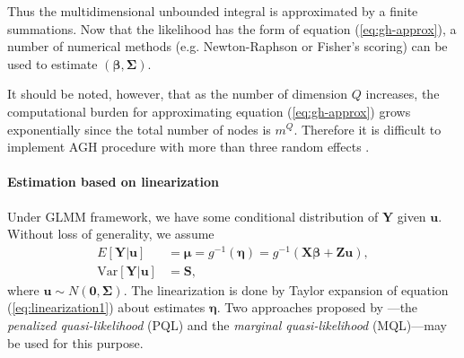 Thus the multidimensional unbounded integral is approximated by a finite summations. Now that the
likelihood has the form of equation (\ref{eq:gh-approx}), a number of numerical methods (e.g. 
Newton-Raphson
or Fisher's scoring) can be used to estimate $(\bm \beta,  \bm \Sigma)$. 

It should be noted, however, that as the number of dimension $Q$ increases, the computational 
burden for approximating equation (\ref{eq:gh-approx}) grows exponentially since the total number 
of nodes is $m^Q$. Therefore it is difficult to implement AGH procedure with more than three random 
effects \citep{bolker2009generalized}.


\paragraph{Estimation based on linearization}\label{para:linearization}



Under GLMM framework, we have some conditional distribution of $\bm Y$ given $\bm u$. Without loss
of generality, we assume
\begin{equation}\label{eq:linearization1}
	\begin{aligned}
		E[\bm Y|\bm u] &= \bm \mu = g^{-1}(\bm \eta) = g^{-1}(\bm{X\beta} + \bm {Zu}), \\
		\text{Var}[\bm Y|\bm u]  & = \bm S,
	\end{aligned}
\end{equation}
where $\bm u \sim N(\bm 0, \bm \Sigma)$.  The linearization is done by Taylor expansion of equation
(\ref{eq:linearization1}) about estimates $\bm \eta$. Two approaches proposed by \citet{breslow1993approximate}---the
\textit{penalized quasi-likelihood } (PQL) and the \textit{marginal quasi-likelihood} (MQL)---may be used
for this purpose. 

